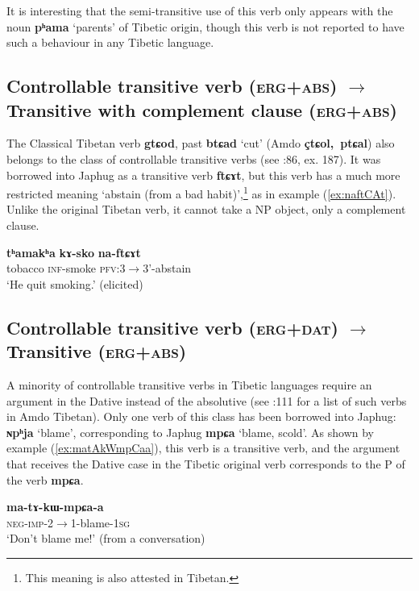 \documentclass[oneside,a4paper,11pt]{article}
\newcommand{\ipa}[1]{{\phon\textbf{\mbox{#1}}}} %
\newcommand{\refb}[1]{(\ref{#1})}
\begin{document}
It is interesting that the semi-transitive use of this verb only appears with the noun \ipa{pʰama} `parents' of Tibetic origin, though this verb is not reported to have such a behaviour in any Tibetic language.



\subsection{Controllable transitive verb (\textsc{erg+abs})  $\rightarrow$ Transitive with complement clause (\textsc{erg+abs})}
The Classical Tibetan verb \ipa{gtɕod}, past \ipa{btɕad} `cut' (Amdo \ipa{çtɕol, ptɕal}) also belongs to the class of controllable transitive verbs (see \citealt{haller04themchen}:86, ex. 187). It was borrowed into Japhug as a transitive verb \ipa{ftɕɤt}, but this verb has a much more restricted meaning `abstain (from a bad habit)',\footnote{This meaning is also attested in Tibetan.} as in example \refb{ex:naftCAt}. Unlike the original Tibetan verb, it cannot take a NP object, only a complement clause.

\begin{exe}
\ex \label{ex:naftCAt}
\gll
\ipa{tʰamakʰa} \ipa{kɤ-sko} \ipa{na-ftɕɤt}\\
tobacco \textsc{inf}-smoke \textsc{pfv}:3$\rightarrow$3'-abstain \\
\glt `He quit smoking.' (elicited)
\end{exe}

\subsection{Controllable transitive verb (\textsc{erg+dat})  $\rightarrow$ Transitive (\textsc{erg+abs}) }
A minority of controllable transitive verbs in Tibetic languages require an argument in the Dative instead of the absolutive (see \citealt{haller04themchen}:111 for a list of such verbs in Amdo Tibetan). Only one verb of this class has been borrowed into Japhug: \ipa{ɴpʰja} `blame', corresponding to Japhug \ipa{mpɕa} `blame, scold'. As shown by example \refb{ex:matAkWmpCaa}, this verb is a transitive verb, and the argument that receives the Dative case in the Tibetic original verb corresponds to the P of the verb \ipa{mpɕa}.

\begin{exe}
\ex \label{ex:matAkWmpCaa}
\gll
  \ipa{ma-tɤ-kɯ-mpɕa-a} \\
  \textsc{neg-imp}-2$\rightarrow$1-blame-\textsc{1sg} \\
\glt `Don't blame me!' (from a conversation)
\end{exe}
  
\end{document}
